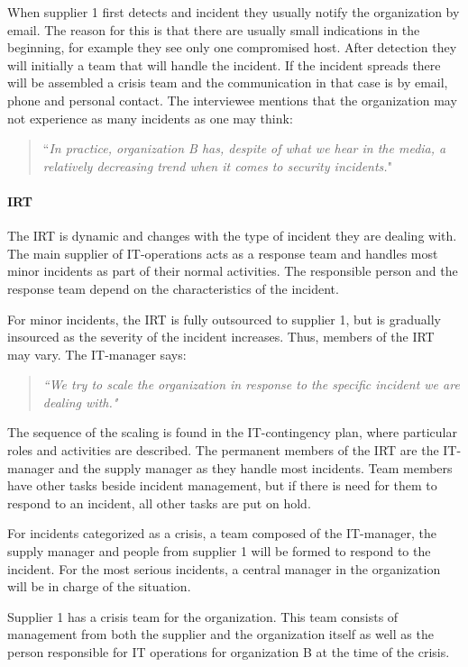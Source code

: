 When supplier 1 first detects and incident they usually notify the organization by email. The reason for this is that there are usually small indications in the beginning, for example they see only one compromised host. After detection they will initially a team that will handle the incident. If the incident spreads there will be assembled a crisis team and the communication in that case is by email, phone and personal contact. The interviewee mentions that the organization may not experience as many incidents as one may think:

\begin{quote}
``\textit{In practice, organization B has, despite of what we hear in the media, a relatively decreasing trend when it comes to security incidents.}"
\end{quote}

\paragraph{\acl{IRT}}
The \ac{IRT} is dynamic and changes with the type of incident they are dealing with. The main supplier of IT-operations acts as a response team and handles most minor incidents as part of their normal activities. The responsible person and the response team depend on the characteristics of the incident.   

For minor incidents, the \ac{IRT} is fully outsourced to supplier 1, but is gradually insourced as the severity of the incident increases. Thus, members of the \ac{IRT} may vary. The IT-manager says:
\begin{quote}
\textit{``We try to scale the organization in response to the specific incident we are dealing with."}
\end{quote}

The sequence of the scaling is found in the IT-contingency plan, where particular roles and activities are described. The permanent members of the \ac{IRT} are the IT-manager and the supply manager as they handle most incidents. Team members have other tasks beside incident management, but if there is need for them to respond to an incident, all other tasks are put on hold.

For incidents categorized as a crisis, a team composed of the IT-manager, the supply manager and people from supplier 1 will be formed to respond to the incident. For the most serious incidents, a central manager in the organization will be in charge of the situation.

Supplier 1 has a crisis team for the organization. This team consists of management from both the supplier and the organization itself as well as the person responsible for IT operations for organization B at the time of the crisis.

